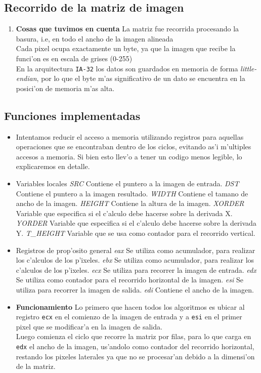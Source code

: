 \documentclass[11pt]{article}
\begin{document}
\newpage
\subsection{Recorrido de la matriz de imagen}
\begin{enumerate}
\item \textbf{Cosas que tuvimos en cuenta} 
\subitem La matriz fue recorrida procesando la basura, i.e, en todo el ancho de la imagen alineada \\
\subitem Cada pixel ocupa exactamente un byte, ya que la imagen que recibe la funci'on es en escala de grises (0-255)  \\
\subitem En la arquitectura \verb'IA-32' los datos son guardados en memoria de forma \emph{little-endian}, por lo que el byte m'as significativo de un dato se encuentra en la posici'on de memoria m'as alta.
\end{enumerate}

\subsection{Funciones implementadas}
\begin{itemize}
\item Intentamos reducir el acceso a memoria utilizando registros para aquellas operaciones que se encontraban dentro de los ciclos, evitando as'i m'ultiples accesos a memoria. Si bien esto llev'o a tener un codigo menos legible, lo explicaremos en detalle.
\item Variables locales
\subitem \textit{SRC} Contiene el puntero a la imagen de entrada.
\subitem \textit{DST} Contiene el puntero a la imagen resultado.
\subitem \textit{WIDTH} Contiene el tamano de ancho de la imagen.
\subitem \textit{HEIGHT} Contiene la altura de la imagen.
\subitem \textit{XORDER} Variable que especifica si el c'alculo debe hacerse sobre la derivada X.
\subitem \textit{YORDER} Variable que especifica si el c'alculo debe hacerse sobre la derivada Y.
\subitem \textit{T\_HEIGHT} Variable que se usa como contador para el recorrido vertical.
\item Registros de prop'osito general 
\subitem \textit{eax} Se utiliza como acumulador, para realizar los c'alculos de los p'ixeles.
\subitem \textit{ebx} Se utiliza como acumulador, para realizar los c'alculos de los p'ixeles.
\subitem \textit{ecx} Se utiliza para recorrer la imagen de entrada.
\subitem \textit{edx} Se utiliza como contador para el recorrido horizontal de la imagen.
\subitem \textit{esi} Se utiliza para recorrer la imagen de salida.
\subitem \textit{edi} Contiene el ancho de la imagen.
\item \textbf{Funcionamiento}
\subitem Lo primero que hacen todos los algoritmos es ubicar al registro \verb'ecx' en el comienzo de la imagen de entrada y a \verb'esi' en el primer pixel que se modificar'a en la imagen de salida.\\
Luego comienza el ciclo que recorre la matriz por filas, para lo que carga en \verb'edx' el ancho de la imagen, us'andolo como contador del recorrido horizontal, restando los pixeles laterales ya que no se procesar'an debido a la dimensi'on de la matriz.
\end{itemize}
\end{document}
